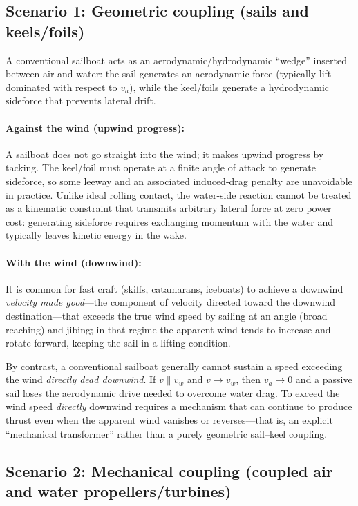 \documentclass[reprint,aps,pra,longbibliography]{revtex4-2}
\begin{document}
\subsection{Scenario 1: Geometric coupling (sails and keels/foils)}

A conventional sailboat acts as an aerodynamic/hydrodynamic ``wedge'' inserted
between air and water: the sail generates an aerodynamic force (typically
lift-dominated with respect to $v_a$), while the keel/foils generate a
hydrodynamic sideforce that prevents lateral drift.

\paragraph*{Against the wind (upwind progress):}
A sailboat does not go straight into the wind; it makes upwind progress by
tacking.  The keel/foil must operate at a finite angle of attack to generate
sideforce, so some leeway and an associated induced-drag penalty are unavoidable
in practice.  Unlike ideal rolling contact, the water-side reaction cannot be
treated as a kinematic constraint that transmits arbitrary lateral force at
zero power cost: generating sideforce requires exchanging momentum with the
water and typically leaves kinetic energy in the wake.

\paragraph*{With the wind (downwind):}
It is common for fast craft (skiffs, catamarans, iceboats) to achieve a downwind
\emph{velocity made good}---the component of velocity directed toward the downwind destination---that exceeds the true wind speed by sailing at
an angle (broad reaching) and jibing; in that regime the apparent wind tends to
increase and rotate forward, keeping the sail in a lifting condition.

By contrast, a conventional sailboat generally cannot sustain a speed exceeding
the wind \emph{directly dead downwind}.  If $v \parallel v_w$
and $v \to v_w$, then $v_a \to 0$ and a passive sail loses
the aerodynamic drive needed to overcome water drag.  To exceed the wind speed
\emph{directly} downwind requires a mechanism that can continue to produce thrust
even when the apparent wind vanishes or reverses---that is, an explicit
``mechanical transformer'' rather than a purely geometric sail--keel coupling.

\subsection{Scenario 2: Mechanical coupling (coupled air and water propellers/turbines)}
\end{document}
